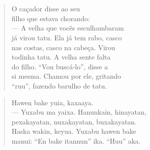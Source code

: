 \chapter*{}

\mbox{}\vspace*{\fill}

\begin{verse}
O caçador disse ao seu\\
filho que estava chorando:\\
— A velha que vocês esculhambaram\\
já virou tatu. Ela já tem rabo, casco\\
nas costas, casco na cabeça. Virou\\
todinha tatu. A velha sente falta\\
do filho. “Vou buscá-lo”, disse a\\
si mesma. Chamou por ele, gritando\\
“ruu”, fazendo barulho de tatu.
\end{verse}

\begin{verse}
Hawen bake yuia, kaxaaya.\\
— Yuxabu ma yaixa. Hanunkain, hinayatan,\\
pexakayatan, nuxakayatan, buxakayatan.\\
Haska wakin, keyua. Yuxabu hawen bake\\
manui: “En bake itannun” ika. “Huu” aka.
\end{verse}

\vspace*{\fill}

